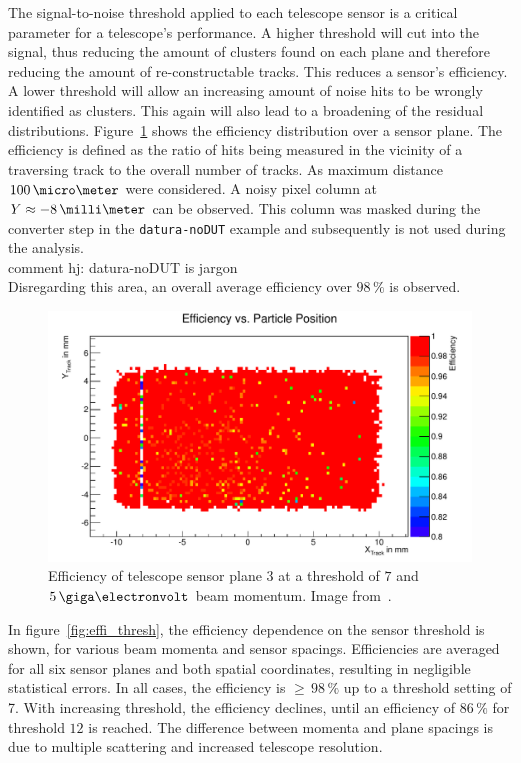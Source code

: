 The signal-to-noise threshold applied to each telescope sensor is a critical parameter for a telescope's performance.
A higher threshold will cut into the signal, thus reducing the amount of clusters found on each plane and therefore reducing the amount of re-constructable tracks.
This reduces a sensor's efficiency.
A lower threshold will allow an increasing amount of noise hits to be wrongly identified as clusters.
This again will also lead to a broadening of the residual distributions.
Figure~\ref{fig:effi} shows the efficiency distribution over a sensor plane.
The efficiency is defined as the ratio of hits being measured in the vicinity of a traversing track to the overall number of tracks.
As maximum distance $100\,\micro\meter$ were considered.
A noisy pixel column at $Y \approx -8\,\milli\meter$ can be observed.
This column was masked during the converter step in the \texttt{datura-noDUT} example and subsequently is not used during the analysis. 
\\{comment hj: datura-noDUT is jargon}\\
Disregarding this area, an overall average efficiency over $98\,\%$ is observed.

\begin{figure}[tbp]
  \centering
  \includegraphics[width=\textwidth]{figures/plane3_effi_run37.pdf}
  \caption[Telescope sensor efficiency~\cite{ref:thomas}]{Efficiency of telescope sensor plane $3$ at a threshold of $7$ and $5\,\giga\electronvolt$ beam momentum.
Image from~\cite{ref:thomas}.}
\label{fig:effi}
\end{figure}

In figure~\ref{fig:effi_thresh}, the efficiency dependence on the sensor threshold is shown, for various beam momenta and sensor spacings.
Efficiencies are averaged for all six sensor planes and both spatial coordinates, resulting in negligible statistical errors. 
In all cases, the efficiency is $\ge\,98\,\%$ up to a threshold setting of 7.
With increasing threshold, the efficiency declines, until an efficiency of $86\,\%$ for threshold $12$ is reached.
The difference between momenta and plane spacings is due to multiple scattering and increased telescope resolution.

